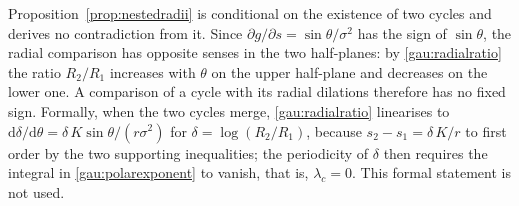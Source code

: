Proposition~\ref{prop:nestedradii} is conditional on the existence of two cycles and derives no contradiction from it. Since $\partial g/\partial s=\sin\theta/\sigma^2$ has the sign of $\sin\theta$, the radial comparison has opposite senses in the two half-planes: by \eqref{gau:radialratio} the ratio $R_2/R_1$ increases with $\theta$ on the upper half-plane and decreases on the lower one. A comparison of a cycle with its radial dilations therefore has no fixed sign. Formally, when the two cycles merge, \eqref{gau:radialratio} linearises to $\mathrm d\delta/\mathrm d\theta=\delta\,K\sin\theta/(r\sigma^2)$ for $\delta=\log(R_2/R_1)$, because $s_2-s_1=\delta\,K/r$ to first order by the two supporting inequalities; the periodicity of $\delta$ then requires the integral in \eqref{gau:polarexponent} to vanish, that is, $\lambda_c=0$. This formal statement is not used.

